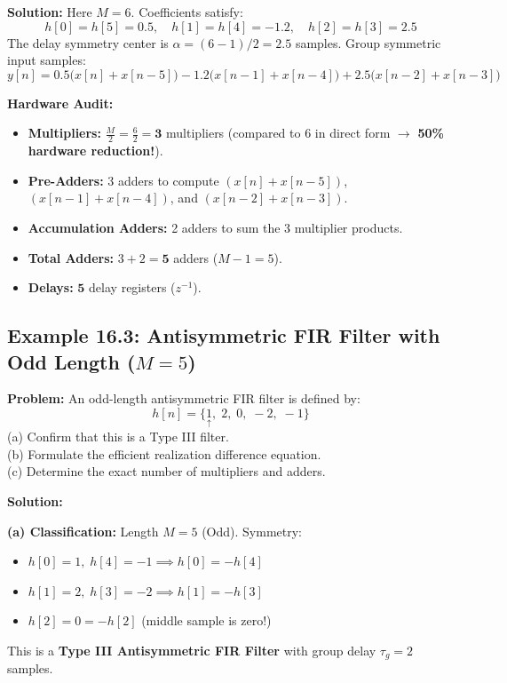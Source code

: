 \documentclass[11pt,a4paper]{article}
\begin{document}
\vspace{0.3cm}
\noindent\textbf{Solution:}
Here $M = 6$. Coefficients satisfy:
\begin{equation}
h[0] = h[5] = 0.5, \quad h[1] = h[4] = -1.2, \quad h[2] = h[3] = 2.5
\end{equation}
The delay symmetry center is $\alpha = (6-1)/2 = 2.5$ samples.
Group symmetric input samples:
\begin{equation}
y[n] = 0.5 \Big( x[n] + x[n-5] \Big) - 1.2 \Big( x[n-1] + x[n-4] \Big) + 2.5 \Big( x[n-2] + x[n-3] \Big)
\end{equation}

\noindent\textbf{Hardware Audit:}
\begin{itemize}
    \item \textbf{Multipliers:} $\frac{M}{2} = \frac{6}{2} = \mathbf{3}$ multipliers (compared to 6 in direct form $\to$ \textbf{50\% hardware reduction!}).
    \item \textbf{Pre-Adders:} 3 adders to compute $(x[n]+x[n-5])$, $(x[n-1]+x[n-4])$, and $(x[n-2]+x[n-3])$.
    \item \textbf{Accumulation Adders:} 2 adders to sum the 3 multiplier products.
    \item \textbf{Total Adders:} $3 + 2 = \mathbf{5}$ adders ($M-1 = 5$).
    \item \textbf{Delays:} $\mathbf{5}$ delay registers ($z^{-1}$).
\end{itemize}

\vspace{0.4cm}
\subsection{\texorpdfstring{Example 16.3: Antisymmetric FIR Filter with Odd Length ($M=5$)}{Example 16.3: Antisymmetric FIR Filter with Odd Length (M=5)}}
\textbf{Problem:} An odd-length antisymmetric FIR filter is defined by:
\begin{equation}
h[n] = \{ \underset{\uparrow}{1}, \; 2, \; 0, \; -2, \; -1 \}
\end{equation}
(a) Confirm that this is a Type III filter. \\
(b) Formulate the efficient realization difference equation. \\
(c) Determine the exact number of multipliers and adders.

\vspace{0.3cm}
\noindent\textbf{Solution:}

\noindent\textbf{(a) Classification:}
Length $M = 5$ (Odd).
Symmetry:
\begin{itemize}
    \item $h[0] = 1, \; h[4] = -1 \implies h[0] = -h[4]$
    \item $h[1] = 2, \; h[3] = -2 \implies h[1] = -h[3]$
    \item $h[2] = 0 = -h[2]$ (middle sample is zero!)
\end{itemize}
This is a \textbf{Type III Antisymmetric FIR Filter} with group delay $\tau_g = 2$ samples.
\end{document}
